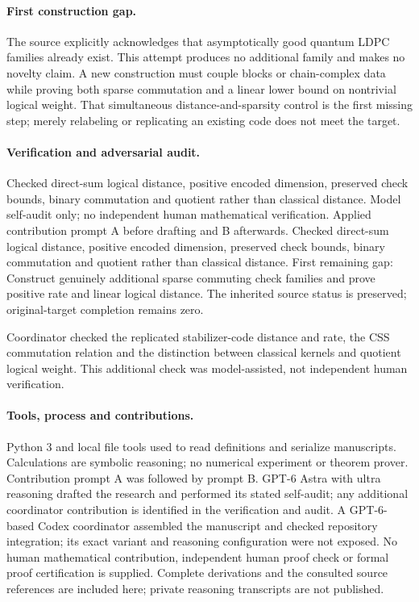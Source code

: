 \documentclass[11pt]{article}
\begin{document}
\paragraph{First construction gap.} The source explicitly acknowledges that asymptotically good quantum LDPC families already exist. This attempt produces no additional family and makes no novelty claim. A new construction must couple blocks or chain-complex data while proving both sparse commutation and a linear lower bound on nontrivial logical weight. That simultaneous distance-and-sparsity control is the first missing step; merely relabeling or replicating an existing code does not meet the target.

\paragraph{Verification and adversarial audit.}
Checked direct-sum logical distance, positive encoded dimension, preserved check bounds, binary commutation and quotient rather than classical distance. Model self-audit only; no independent human mathematical verification. Applied contribution prompt A before drafting and B afterwards. Checked direct-sum logical distance, positive encoded dimension, preserved check bounds, binary commutation and quotient rather than classical distance. First remaining gap: Construct genuinely additional sparse commuting check families and prove positive rate and linear logical distance. The inherited source status is preserved; original-target completion remains zero.

Coordinator checked the replicated stabilizer-code distance and rate, the CSS commutation relation and the distinction between classical kernels and quotient logical weight. This additional check was model-assisted, not independent human verification.

\paragraph{Tools, process and contributions.}
Python 3 and local file tools used to read definitions and serialize manuscripts. Calculations are symbolic reasoning; no numerical experiment or theorem prover. Contribution prompt A was followed by prompt B. GPT-6 Astra with ultra reasoning drafted the research and performed its stated self-audit; any additional coordinator contribution is identified in the verification and audit. A GPT-6-based Codex coordinator assembled the manuscript and checked repository integration; its exact variant and reasoning configuration were not exposed. No human mathematical contribution, independent human proof check or formal proof certification is supplied. Complete derivations and the consulted source references are included here; private reasoning transcripts are not published.
\end{document}

